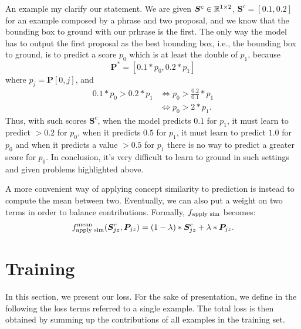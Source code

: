 An example my clarify our statement. We are given $\bm{S}^c \in
\mathbb{R}^{1 \times 2}$, $\bm{S}^c = [0.1, 0.2]$ for an example composed by a
phrase and two proposal, and we know that the bounding box to ground
with our prhrase is the first. The only way the model has to output
the first proposal as the best bounding box, i.e., the bounding box to
ground, is to predict a score $p_{0}$ which is at least the double of
$p_{1}$, because
\begin{equation}
  \bm{P}^* = [0.1 * p_{0}, 0.2 * p_{1}]
\end{equation}
where $p_{j} = \bm{P}[0, j]$, and 
\begin{equation}
\begin{split}
0.1 * p_{0} > 0.2 * p_{1} & \iff p_{0} >  \frac{0.2}{0.1} * p_{1} \\
  & \iff p_{0} > 2 * p_{1}.
\end{split}
\end{equation}
Thus, with such scores $\bm{S}^c$, when the model predicts $0.1$ for
$p_1$, it must learn to predict $> 0.2$ for $p_0$, when it predicts
$0.5$ for $p_1$, it must learn to predict $1.0$ for $p_0$ and when it
predicts a value $> 0.5$ for $p_1$ there is no way to predict a
greater score for $p_0$. In conclusion, it's very difficult to learn
to ground in such settings and given problems highlighted above.

A more convenient way of applying concept similarity to prediction is
instead to compute the mean between two. Eventually, we can also put a
weight on two terms in order to balance contributions. Formally,
$f_{\text{apply sim}}$ becomes:
\begin{equation}
  f_{\text{apply sim}}^{\text{mean}} (\bm{S}^c_{jz}, \bm{P}_{jz}) = (1 - \lambda) * \bm{S}^c_{jz} + \lambda * \bm{P}_{jz}.
\end{equation}

\section{Training}

In this section, we present our loss. For the sake of presentation, we
define in the following the loss terms referred to a single example.
The total loss is then obtained by summing up the contributions of all
examples in the training set.

